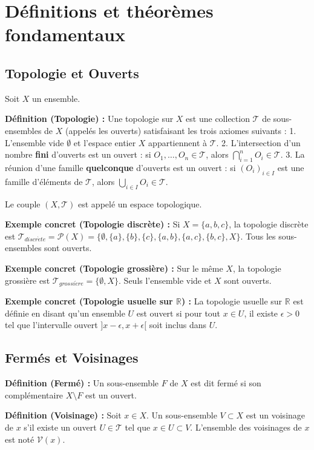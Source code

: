\documentclass[11pt,a4paper]{article}
\begin{document}
\section{Définitions et théorèmes fondamentaux}

\subsection{Topologie et Ouverts}

Soit $X$ un ensemble.

\textbf{Définition (Topologie) :}
Une topologie sur $X$ est une collection $\mathcal{T}$ de sous-ensembles de $X$ (appelés les ouverts) satisfaisant les trois axiomes suivants :
1. L'ensemble vide $\emptyset$ et l'espace entier $X$ appartiennent à $\mathcal{T}$.
2. L'intersection d'un nombre \textbf{fini} d'ouverts est un ouvert : si $O_1, \dots, O_n \in \mathcal{T}$, alors $\bigcap_{i=1}^n O_i \in \mathcal{T}$.
3. La réunion d'une famille \textbf{quelconque} d'ouverts est un ouvert : si $(O_i)_{i \in I}$ est une famille d'éléments de $\mathcal{T}$, alors $\bigcup_{i \in I} O_i \in \mathcal{T}$.

Le couple $(X, \mathcal{T})$ est appelé un espace topologique.

\textbf{Exemple concret (Topologie discrète) :}
Si $X = \{a, b, c\}$, la topologie discrète est $\mathcal{T}_{discr\grave{e}te} = \mathcal{P}(X) = \{\emptyset, \{a\}, \{b\}, \{c\}, \{a,b\}, \{a,c\}, \{b,c\}, X\}$. Tous les sous-ensembles sont ouverts.

\textbf{Exemple concret (Topologie grossière) :}
Sur le même $X$, la topologie grossière est $\mathcal{T}_{grossi\grave{e}re} = \{\emptyset, X\}$. Seuls l'ensemble vide et $X$ sont ouverts.

\textbf{Exemple concret (Topologie usuelle sur $\mathbb{R}$) :}
La topologie usuelle sur $\mathbb{R}$ est définie en disant qu'un ensemble $U$ est ouvert si pour tout $x \in U$, il existe $\epsilon > 0$ tel que l'intervalle ouvert $]x-\epsilon, x+\epsilon[$ soit inclus dans $U$.

\subsection{Fermés et Voisinages}

\textbf{Définition (Fermé) :}
Un sous-ensemble $F$ de $X$ est dit fermé si son complémentaire $X \setminus F$ est un ouvert.

\textbf{Définition (Voisinage) :}
Soit $x \in X$. Un sous-ensemble $V \subset X$ est un voisinage de $x$ s'il existe un ouvert $U \in \mathcal{T}$ tel que $x \in U \subset V$.
L'ensemble des voisinages de $x$ est noté $\mathcal{V}(x)$.
\end{document}
